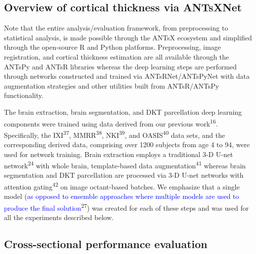\documentclass[12pt,]{article}
\begin{document}


\hypertarget{overview-of-cortical-thickness-via-antsxnet}{%
\subsection*{Overview of cortical thickness via
ANTsXNet}\label{overview-of-cortical-thickness-via-antsxnet}}

Note that the entire analysis/evaluation framework, from preprocessing
to statistical analysis, is made possible through the ANTsX ecosystem
and simplified through the open-source R and Python platforms.
Preprocessing, image registration, and cortical thickness estimation are
all available through the ANTsPy and ANTsR libraries whereas the deep
learning steps are performed through networks constructed and trained
via ANTsRNet/ANTsPyNet with data augmentation strategies and other
utilities built from ANTsR/ANTsPy functionality.

The brain extraction, brain segmentation, and DKT parcellation deep
learning components were trained using data derived from our previous
work\textsuperscript{16}. Specifically, the IXI\textsuperscript{37},
MMRR\textsuperscript{38}, NKI\textsuperscript{39}, and
OASIS\textsuperscript{40} data sets, and the corresponding derived data,
comprising over 1200 subjects from age 4 to 94, were used for network
training. Brain extraction employs a traditional 3-D U-net
network\textsuperscript{24} with whole brain, template-based data
augmentation\textsuperscript{41} whereas brain segmentation and DKT
parcellation are processed via 3-D U-net networks with attention
gating\textsuperscript{42} on image octant-based batches. We emphasize
that a single model (\textcolor{blue}{as opposed to ensemble
approaches where multiple models are used to produce the final solution}\textsuperscript{27})
was created for each of these steps and was used for all the experiments
described below.

\hypertarget{cross-sectional-performance-evaluation}{%
\subsection*{Cross-sectional performance
evaluation}\label{cross-sectional-performance-evaluation}}
\end{document}
